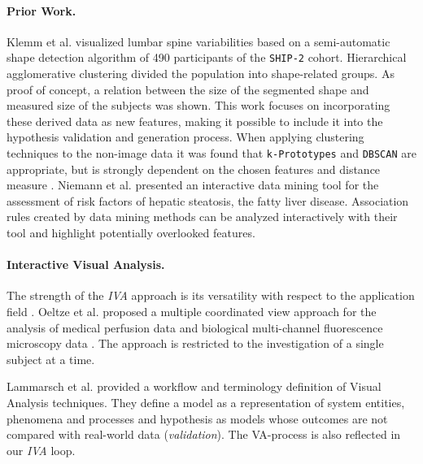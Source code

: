 \documentclass[journal]{style/vgtc} 			          %
\newcommand{\add}[1]{\textcolor{blue}{\uline{#1}}}
\begin{document}
\paragraph{Prior Work.}
Klemm et al. \cite{Klemm2013VMV} visualized lumbar spine variabilities based on a semi-automatic shape detection algorithm of 490 participants of the \texttt{SHIP-2} cohort.
%
Hierarchical agglomerative clustering divided the population into shape-related groups.
%
As proof of concept, a relation between the size of the segmented shape and measured size of the subjects was shown.
%
This work focuses on incorporating these derived data as new features, making it possible to include it into the hypothesis validation and generation process.
%
When applying clustering techniques to the non-image data it was found that \texttt{k-Prototypes} and \texttt{DBSCAN} are appropriate, but is strongly dependent on the chosen features and distance measure \cite{Klemm2014BVM}.
%
Niemann et al. \cite{Niemann2014} presented an interactive data mining tool for the assessment of risk factors of hepatic steatosis, the fatty liver disease.
%
Association rules created by data mining methods can be analyzed interactively with their tool and highlight potentially overlooked features.
%

\paragraph{Interactive Visual Analysis.}
The strength of the \emph{IVA} approach is its versatility with respect to the application field \cite{Konyha2009}.
%
Oeltze et al. proposed a multiple coordinated view approach for the analysis of medical perfusion data \cite{Oeltze2007} and biological multi-channel fluorescence microscopy data \cite{Oeltze2011}.
%
The approach is restricted to the investigation of a single subject at a time.
%

Lammarsch et al. \cite{Lammarsch2011} provided a workflow and terminology definition of Visual Analysis techniques.
%
They define a model as a representation of system entities, phenomena and processes and hypothesis as models whose outcomes are not compared with real-world data (\emph{validation}).
%
The VA-process is also reflected in our \emph{IVA} loop.
\end{document}
